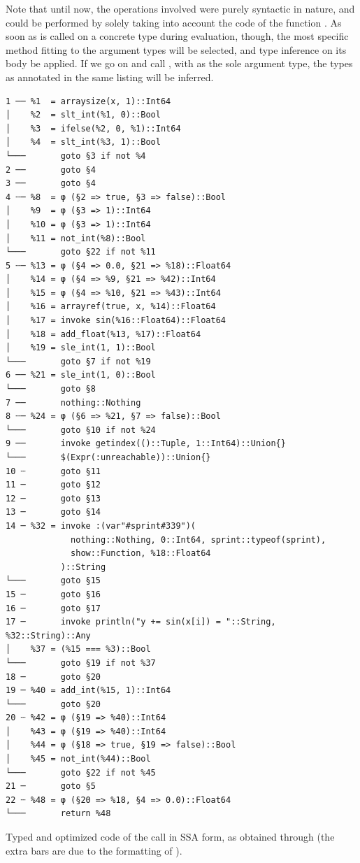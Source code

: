 Note that until now, the operations involved were purely syntactic in nature, and could be performed
by solely taking into account the code of the function .  As soon as  is
called on a concrete type during evaluation, though, the most specific method fitting to the
argument types will be selected, and type inference on its body be applied.  If we go on and call
, with  as the sole argument type, the types as annotated in
the same listing will be inferred.

\begin{lstfloat}[p]
  \begin{lstlisting}[style=lstfloat]
1 ── %1  = arraysize(x, 1)::Int64
│    %2  = slt_int(%1, 0)::Bool
│    %3  = ifelse(%2, 0, %1)::Int64
│    %4  = slt_int(%3, 1)::Bool
└───       goto §3 if not %4
2 ──       goto §4
3 ──       goto §4
4 ┄─ %8  = φ (§2 => true, §3 => false)::Bool
│    %9  = φ (§3 => 1)::Int64
│    %10 = φ (§3 => 1)::Int64
│    %11 = not_int(%8)::Bool
└───       goto §22 if not %11
5 ┄─ %13 = φ (§4 => 0.0, §21 => %18)::Float64
│    %14 = φ (§4 => %9, §21 => %42)::Int64
│    %15 = φ (§4 => %10, §21 => %43)::Int64
│    %16 = arrayref(true, x, %14)::Float64
│    %17 = invoke sin(%16::Float64)::Float64
│    %18 = add_float(%13, %17)::Float64
│    %19 = sle_int(1, 1)::Bool
└───       goto §7 if not %19
6 ── %21 = sle_int(1, 0)::Bool
└───       goto §8
7 ──       nothing::Nothing
8 ┄─ %24 = φ (§6 => %21, §7 => false)::Bool
└───       goto §10 if not %24
9 ──       invoke getindex(()::Tuple, 1::Int64)::Union{}
└───       $(Expr(:unreachable))::Union{}
10 ┄       goto §11
11 ─       goto §12
12 ─       goto §13
13 ─       goto §14
14 ─ %32 = invoke :(var"#sprint#339")(
             nothing::Nothing, 0::Int64, sprint::typeof(sprint), 
             show::Function, %18::Float64
           )::String
└───       goto §15
15 ─       goto §16
16 ─       goto §17
17 ─       invoke println("y += sin(x[i]) = "::String, %32::String)::Any
│    %37 = (%15 === %3)::Bool
└───       goto §19 if not %37
18 ─       goto §20
19 ─ %40 = add_int(%15, 1)::Int64
└───       goto §20
20 ┄ %42 = φ (§19 => %40)::Int64
│    %43 = φ (§19 => %40)::Int64
│    %44 = φ (§18 => true, §19 => false)::Bool
│    %45 = not_int(%44)::Bool
└───       goto §22 if not %45
21 ─       goto §5
22 ┄ %48 = φ (§20 => %18, §4 => 0.0)::Float64
└───       return %48
\end{lstlisting}
  \caption{Typed and optimized code of the call \protect{} in SSA form, as obtained
    through \protect{} (the extra bars are due to the formatting of
    \protect{}).\label{lst:foo-typed}}
\end{lstfloat}

